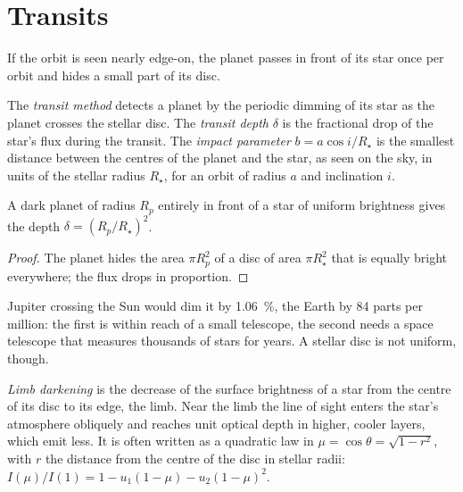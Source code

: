 \section{Transits}\label{sec:b3:exoplanets:transits}

If the orbit is seen nearly edge-on, the planet passes in front of its
star once per orbit and hides a small part of its disc.

\begin{definition}\label{def:b3:exoplanets:transit}
The \emph{transit method} detects a planet by the
periodic dimming of its star as the planet crosses the stellar disc. The
\emph{transit depth} $\delta$ is the fractional drop
of the star's flux during the transit. The \emph{impact
parameter} $b = a\cos i/R_\star$ is the
smallest distance between the centres of the planet and the star, as seen
on the sky, in units of the stellar radius $R_\star$, for an orbit of
radius $a$ and inclination $i$.
\end{definition}

\begin{proposition}\label{prop:b3:exoplanets:depth}
A dark planet of radius $R_p$ entirely in front of a star of uniform
brightness gives the depth $\delta = (R_p/R_\star)^2$.
\end{proposition}

\begin{proof}
The planet hides the area $\pi R_p^2$ of a disc of area $\pi R_\star^2$
that is equally bright everywhere; the flux drops in proportion.
\end{proof}

Jupiter crossing the Sun would dim it by \qty{1.06}{\percent}, the Earth
by \num{84} parts per million: the first is within reach of a small
telescope, the second needs a space telescope that measures thousands of
stars for years. A stellar disc is not uniform, though.

\begin{definition}\label{def:b3:exoplanets:limb}
\emph{Limb darkening} is the decrease of the surface
brightness of a star from the centre of its disc to its edge, the limb.
Near the limb the line of sight enters the star's atmosphere obliquely
and reaches unit optical depth in higher, cooler layers, which emit
less. It is often written as a quadratic law in $\mu = \cos\theta =
\sqrt{1 - r^2}$, with $r$ the distance from the centre of the disc in
stellar radii: $I(\mu)/I(1) = 1 - u_1(1 - \mu) - u_2(1 - \mu)^2$.
\end{definition}

